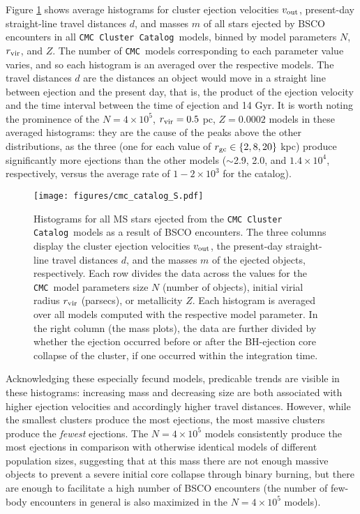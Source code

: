 \documentclass[twocolumn]{aastex631}
\newcommand{\CMC}{\texttt{CMC}}
\newcommand{\CMCcat}{\texttt{CMC Cluster Catalog}}
\begin{document}
Figure \ref{fig:cmc_catalog} shows average histograms for cluster ejection velocities $v_{\rm out}$, present-day straight-line travel distances $d$, and masses $m$ of all stars ejected by BSCO encounters in all \CMCcat\ models, binned by model parameters $N$, $r_{\rm vir}$, and $Z$.
The number of \CMC\ models corresponding to each parameter value varies, and so each histogram is an averaged over the respective models.
The travel distances $d$ are the distances an object would move in a straight line between ejection and the present day, that is, the product of the ejection velocity and the time interval between the time of ejection and 14 Gyr.
It is worth noting the prominence of the $N = 4\times10^5$, $r_{\rm vir} = 0.5$ pc, $Z = 0.0002$ models in these averaged histograms: they are the cause of the peaks above the other distributions, as the three (one for each value of $r_{\rm gc} \in \{2, 8, 20\}$ kpc) produce significantly more ejections than the other models ($\sim$2.9, 2.0, and $1.4 \times 10^4$, respectively, versus the average rate of $1-2 \times 10^3$ for the catalog).


\begin{figure*}
    \centering
    \texttt{[image: figures/cmc\_catalog\_S.pdf]}
    \caption{
        Histograms for all MS stars ejected from the \CMCcat\ models as a result of BSCO encounters.
        The three columns display the cluster ejection velocities $v_{\rm out}$, the present-day straight-line travel distances $d$, and the masses $m$ of the ejected objects, respectively.
        Each row divides the data across the values for the \CMC\ model parameters size $N$ (number of objects), initial virial radius $r_{\rm vir}$ (parsecs), or metallicity $Z$.
        Each histogram is averaged over all models computed with the respective model parameter.
        In the right column (the mass plots), the data are further divided by whether the ejection occurred before or after the BH-ejection core collapse of the cluster, if one occurred within the integration time.
    }
    \label{fig:cmc_catalog}
\end{figure*}

Acknowledging these especially fecund models, predicable trends are visible in these histograms: increasing mass and decreasing size are both associated with higher ejection velocities and accordingly higher travel distances.
However, while the smallest clusters produce the most ejections, the most massive clusters produce the \textit{fewest} ejections.
The $N = 4 \times 10^5$ models consistently produce the most ejections in comparison with otherwise identical models of different population sizes, suggesting that at this mass there are not enough massive objects to prevent a severe initial core collapse through binary burning, but there are enough to facilitate a high number of BSCO encounters (the number of few-body encounters in general is also maximized in the $N = 4 \times 10^5$ models).
\end{document}
